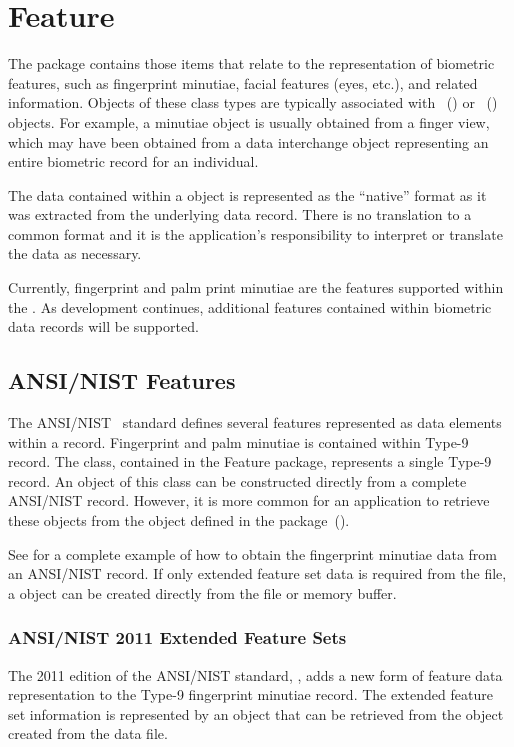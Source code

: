 %
%
\chapter{Feature}
\label{chp-feature}
The  package contains those items that relate to the representation of
biometric features, such as fingerprint minutiae, facial features (eyes, etc.),
and related information. Objects of these class types are typically associated
with ~() or
~()
objects. For example, a minutiae object is usually obtained from a finger view,
which may have been obtained from a data interchange object representing an
entire biometric record for an individual.

The data contained within a  object is represented as the
``native'' format as it was extracted from the underlying data record. There
is no translation to a common format and it is the application's responsibility 
to interpret or translate the data as necessary.

Currently, fingerprint and palm print minutiae are the features supported within
the \sname. As development continues, additional features contained within
biometric data records will be supported.

\section{ANSI/NIST Features}
\label{sec-ansinistfeatures}
The ANSI/NIST~\cite{std:an2k} standard defines several features represented
as data elements within a record. Fingerprint and palm minutiae is contained
within Type-9 record. The  class, contained in the Feature
package, represents a single Type-9 record. An object of this class can be
constructed directly from a complete ANSI/NIST record. However, it is more
common for an application to retrieve these objects from the 
object defined in the  package~().

See  for a complete example of how to obtain
the fingerprint minutiae data from an ANSI/NIST record. If only extended
feature set data is required from the file, a
 object can be created directly
from the file or memory buffer.

\subsection{ANSI/NIST 2011 Extended Feature Sets}
The 2011 edition of the ANSI/NIST standard, \cite{std:an2k11}, adds a new form
of feature data representation to the Type-9 fingerprint minutiae record. The
extended feature set information is represented by an object that can be
retrieved from the  object created from the data
file.

